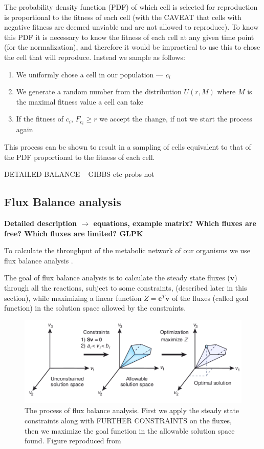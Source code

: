 \documentclass[a4paper,12pt]{article}
\begin{document}
The probability density function (PDF) of which cell is selected for reproduction is proportional to the fitness of each cell (with the CAVEAT that cells with negative fitness are deemed unviable and are not allowed to reproduce). To know this PDF it is necessary to know the fitness of each cell at any given time point (for the normalization), and therefore it would be impractical to use this to chose the cell that will reproduce. Instead we sample as follows: 
\begin{enumerate}
	\item We uniformly chose a cell in our population --- $c_i$
	\item We generate a random number from the distribution $U \left( r,M \right)$ where $M$ is the maximal fitness value a cell can take
	\item If the fitness of $c_i$,  $F_{c_i} \geq r$ we accept the change, if not we start the process again
\end{enumerate}

This process can be shown to result in a sampling of cells equivalent to that of the PDF proportional to the fitness of each cell.

DETAILED BALANCE ~ GIBBS etc probs not

\subsection{Flux Balance analysis}
\label{sub:Flux Balance analysis}

\textbf{Detailed description $\rightarrow$ equations, example matrix? Which fluxes are free? Which fluxes are limited? GLPK }



	To calculate the throughput of the metabolic network of our organisms we use flux balance analysis \cite{whatisfluxbalance}. 	

	The goal of flux balance analysis is to calculate the steady state fluxes ($\mathbf{v}$) through all the reactions, subject to some constraints, (described later in this section), while maximizing a linear function $Z=\mathbf{c}^T \mathbf{v}$ of the fluxes (called goal function) in the solution space allowed by the constraints. 

	\begin{figure}[htpb]
		\centering
		\includegraphics[width=0.8\linewidth]{fba_frompaper.png}
		\caption{The process of flux balance analysis. First we apply the steady state constraints along with FURTHER CONSTRAINTS on the fluxes, then we maximize the goal function in the allowable solution space found. Figure reproduced from \cite[]{whatisfluxbalance} }
		\label{fig:fluxbalance}
	\end{figure}
\end{document}
